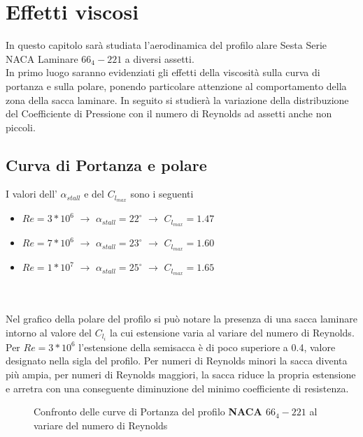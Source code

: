 \chapter{Effetti viscosi}

In questo capitolo sarà studiata l’aerodinamica del profilo alare Sesta Serie NACA Laminare $66_4-221$ a diversi assetti.\\ In primo luogo saranno evidenziati gli effetti della viscosità sulla curva di portanza e sulla polare, ponendo particolare attenzione al comportamento della zona della sacca laminare. In seguito si studierà la variazione della distribuzione del Coefficiente di Pressione con il numero di Reynolds ad assetti anche non piccoli.  

\section{Curva di Portanza e polare }

I valori dell' $ {\alpha}_{stall}$ e del $C_{l_{max}}$ sono i seguenti \\


\begin {itemize}
\item $Re=3*10^6$ ${\to}$ $ {\alpha}_{stall}=22^\circ$  ${\to}$ $C_{l_{max}}=1.47$
\item $Re=7*10^6$ ${\to}$ $ {\alpha}_{stall}=23^\circ$  ${\to}$ $C_{l_{max}}=1.60$
\item $Re=1*10^7$ ${\to}$ $ {\alpha}_{stall}=25^\circ$  ${\to}$ $C_{l_{max}}=1.65$
\end{itemize}

\noindent \\ \\
Nel grafico della polare del profilo si può notare la presenza di una sacca laminare intorno al valore del $C_{l_i}$ la cui estensione varia al variare del numero di Reynolds.\\ Per $ Re=3*10^6$ l’estensione della semisacca è di poco superiore a 0.4, valore designato nella sigla del profilo. Per numeri di Reynolds minori la sacca diventa più ampia, per numeri di Reynolds maggiori, la sacca riduce la propria estensione e arretra con una conseguente diminuzione del minimo coefficiente di resistenza.

\begin{figure} [H]
\centering
{} 
\caption{\footnotesize Confronto delle curve di Portanza del profilo {\bfseries NACA $66_4-221$} al variare del numero di Reynolds }
\end{figure}


